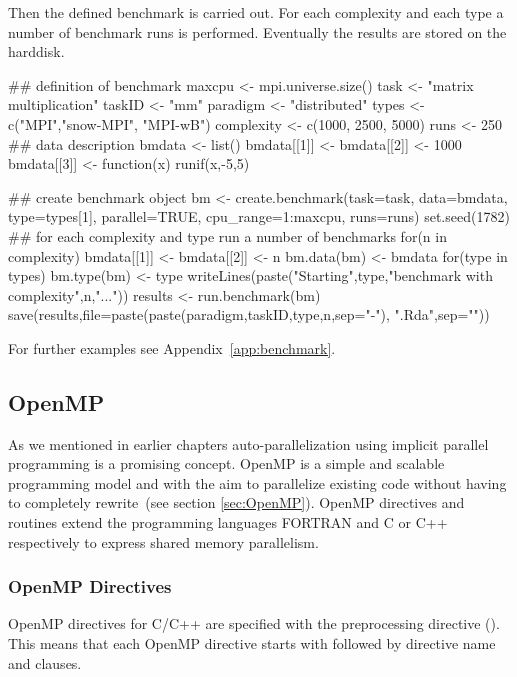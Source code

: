 Then the defined benchmark is carried out. For each complexity and
each type a number of benchmark runs is performed. Eventually the
results are stored on the harddisk.

\begin{Example}
\label{ex:benchmarkruns}
\begin{Scode}
## definition of benchmark
maxcpu <- mpi.universe.size()
task <- "matrix multiplication"
taskID <- "mm"
paradigm <- "distributed"
types <- c("MPI","snow-MPI", "MPI-wB")
complexity <- c(1000, 2500, 5000)
runs <- 250
## data description
bmdata <- list()
bmdata[[1]] <- bmdata[[2]] <- 1000
bmdata[[3]] <- function(x){
  runif(x,-5,5)
}

## create benchmark object
bm <- create.benchmark(task=task, data=bmdata,
                       type=types[1], parallel=TRUE,
                       cpu_range=1:maxcpu, runs=runs)
set.seed(1782)
## for each complexity and type run a number of benchmarks
for(n in complexity){
  bmdata[[1]] <- bmdata[[2]] <- n
  bm.data(bm) <- bmdata
  for(type in types){
    bm.type(bm) <- type
    writeLines(paste("Starting",type,"benchmark with complexity",n,"..."))
    results <- run.benchmark(bm)
    save(results,file=paste(paste(paradigm,taskID,type,n,sep="-"),
         ".Rda",sep=""))
  }
}

\end{Scode}
\end{Example}

For further examples see Appendix~\ref{app:benchmark}.

\subsection{OpenMP}

As we mentioned in earlier chapters auto-parallelization using
implicit parallel programming is a promising concept. OpenMP is a simple and
scalable programming model and with the aim to parallelize existing code
without having to completely rewrite~(see section
\ref{sec:OpenMP}). OpenMP directives and routines extend the
programming languages FORTRAN and C or C++ respectively to express
shared memory parallelism.

\subsubsection{OpenMP Directives}

OpenMP directives for C/C++ are specified with the \textbf{}
preprocessing directive (\cite{openMP05}). This means that each
OpenMP directive starts with \textbf{} followed by
directive name and clauses. 
 
